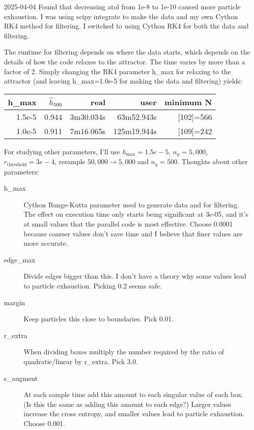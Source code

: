 \documentclass[12pt]{article}
\begin{document}
2025-04-04 Found that decreasing atol from 1e-8 to 1e-10 caused
more particle exhaustion.  I was using scipy integrate to make the
data and my own Cython RK4 method for filtering.  I switched to using
Cython RK4 for both the data and filtering.

The runtime for filtering depends on where the data starts, which
depends on the details of how the code relaxes to the attractor.  The
time varies by more than a factor of 2.  Simply changing the RK4
parameter h\_max for relaxing to the attractor (and leaving
h\_max=1.0e-5 for making the data and filtering) yields:\\
\begin{tabular*}{1.0\linewidth}{rrrrr}
  h\_max & $\hat h_{500}$ & real      & user        & minimum N\\ \hline
  1.5e-5 & 0.944         & 3m30.034s & 63m52.943s  & [102]=566 \\
  1.0e-5 & 0.911         & 7m16.065s & 125m19.944s & [109]=242
\end{tabular*}

For studying other parameters, I'll use $h_{\text{max}}=1.5e-5$,
$n_y=5,000$, $r_{\text{threshold}} = 3e-4$, resample
$50,000 \rightarrow 5,000$ and $n_y = 500$.  Thoughts about other
parameters:
\begin{description}
\item[h\_max] Cython Runge-Kutta parameter used to generate data and
  for filtering.  The effect on execution time only starts being
  significant at 3e-05, and it's at small values that the parallel
  code is most effective.  Choose 0.0001 because coarser values
  don't save time and I believe that finer values are more accurate.\\
  
\item[edge\_max] Divide edges bigger than this.  I don't have a theory
  why some values lead to particle exhaustion.  Picking 0.2 seems safe.\\
  
\item[margin] Keep particles this close to boundaries.  Pick 0.01.\\
    
\item[r\_extra] When dividing boxes multiply the number required by
  the ratio of quadratic/linear by r\_extra.  Pick 3.0. \\
  
\item[s\_augment] At each sample time add this amount to each singular
  value of each box.  (Is this the same as adding this amount to each
  edge?)  Larger values increase the cross entropy, and smaller values
  lead to particle exhaustion.  Choose 0.001.\\
  
\end{description}
\end{document}
